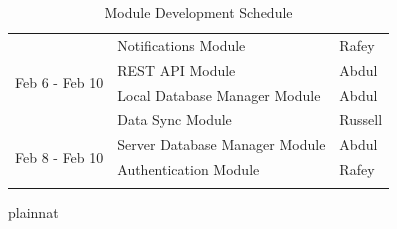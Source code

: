 \documentclass[12pt, titlepage]{article}
\begin{document}
\begin{table}[H]
\begin{tabular}{lll}
\multicolumn{1}{|l|}{\multirow{4}{*}{Feb 6 - Feb 10}}  & \multicolumn{1}{l|}{Notifications Module}                     & \multicolumn{1}{l|}{Rafey}                    \\ \cline{2-3} 
\multicolumn{1}{|l|}{}                                 & \multicolumn{1}{l|}{REST API Module}                          & \multicolumn{1}{l|}{Abdul}                    \\ \cline{2-3} 
\multicolumn{1}{|l|}{}                                 & \multicolumn{1}{l|}{Local Database Manager Module}             & \multicolumn{1}{l|}{Abdul}                    \\ \cline{2-3} 
\multicolumn{1}{|l|}{}                                 & \multicolumn{1}{l|}{Data Sync Module}                         & \multicolumn{1}{l|}{Russell}                  \\ \hline
\multicolumn{1}{|l|}{\multirow{2}{*}{Feb 8 - Feb 10}}  & \multicolumn{1}{l|}{Server Database Manager Module}            & \multicolumn{1}{l|}{Abdul}                    \\ \cline{2-3} 
\multicolumn{1}{|l|}{}                                 & \multicolumn{1}{l|}{Authentication Module}                    & \multicolumn{1}{l|}{Rafey}                    \\ \hline
                                                       &                                                                &                                              
\end{tabular}
\caption{Module Development Schedule}
\label{tab:module_schedule}
\end{table}

 {plainnat}


\newpage{}
\end{document}
